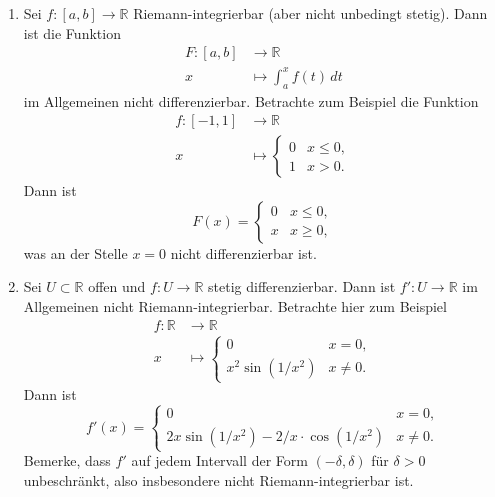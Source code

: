 \documentclass[../main.tex]{subfiles}
\begin{document}
\begin{remarks}
  \leavevmode
  \begin{enumerate}[(1)]
    \item Sei $f \colon [a, b] \to \mathbb{R}$ Riemann-integrierbar
      (aber nicht unbedingt stetig). Dann ist die Funktion
      \begin{align*}
        F \colon [a, b] & \to \mathbb{R} \\
        x & \mapsto \int_{a}^{x} f(t) \, dt
      \end{align*}
      im Allgemeinen nicht differenzierbar.
      Betrachte zum Beispiel die Funktion
      \begin{align*}
        f \colon [-1, 1] & \to \mathbb{R} \\
        x & \mapsto 
        \begin{cases}
          0 & x \leq 0,\\
          1 & x > 0.
        \end{cases}
      \end{align*}
      Dann ist
      \[
        F(x) = 
        \begin{cases}
          0 & x \leq 0,\\
          x & x \geq 0,
        \end{cases}
      \]
      was an der Stelle $x = 0$ nicht differenzierbar ist.
    \item Sei $U \subset \mathbb{R}$ offen und
      $f \colon U \to \mathbb{R}$ stetig differenzierbar.
      Dann ist $f' \colon U \to \mathbb{R}$ im Allgemeinen
      nicht Riemann-integrierbar.
      Betrachte hier zum Beispiel
      \begin{align*}
        f \colon \mathbb{R} & \to \mathbb{R} \\
        x & \mapsto 
        \begin{cases}
          0 & x = 0, \\
          x^2 \sin(1/x^2) & x \neq 0.
        \end{cases}
      \end{align*}
      Dann ist
      \[
        f'(x) = 
        \begin{cases}
          0 & x = 0,\\
          2x \sin(1/x^2) - 2/x \cdot \cos(1/x^2) & x \neq 0.
        \end{cases}
      \]
      Bemerke, dass $f'$ auf jedem Intervall
      der Form $(-\delta, \delta)$ für $\delta > 0$
      unbeschränkt, also insbesondere
      nicht Riemann-integrierbar ist.
  \end{enumerate}
\end{remarks}
\end{document}
